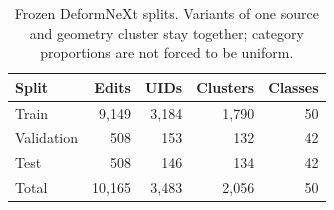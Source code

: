 \begin{table}[t]
\centering
\small
\caption{Frozen DeformNeXt splits. Variants of one source and geometry
cluster stay together; category proportions are not forced to be uniform.}
\label{tab:deformnext-splits}
\begin{tabular}{lrrrr}
\toprule
Split & Edits & UIDs & Clusters & Classes \\
\midrule
Train & 9,149 & 3,184 & 1,790 & 50 \\
Validation & 508 & 153 & 132 & 42 \\
Test & 508 & 146 & 134 & 42 \\
\midrule
Total & 10,165 & 3,483 & 2,056 & 50 \\
\bottomrule
\end{tabular}
\end{table}
